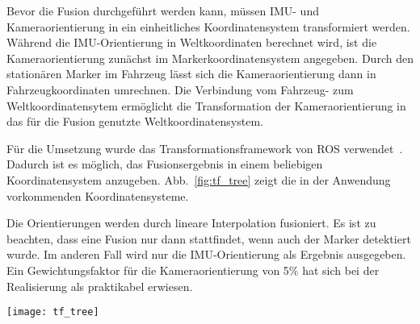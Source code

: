 Bevor die Fusion durchgeführt werden kann, müssen IMU- und Kameraorientierung in ein einheitliches Koordinatensystem transformiert werden.
Während die IMU-Orientierung in Weltkoordinaten berechnet wird, ist die Kameraorientierung zunächst im Markerkoordinatensystem angegeben.
Durch den stationären Marker im Fahrzeug lässt sich die Kameraorientierung dann in Fahrzeugkoordinaten umrechnen.
Die Verbindung vom Fahrzeug- zum Weltkoordinatensytem ermöglicht die Transformation der Kameraorientierung in das für die Fusion genutzte Weltkoordinatensystem.

Für die Umsetzung wurde das Transformationsframework von ROS verwendet~\cite{ros_tf}.
Dadurch ist es möglich, das Fusionsergebnis in einem beliebigen Koordinatensystem anzugeben. Abb.~\ref{fig:tf_tree} zeigt die in der Anwendung vorkommenden Koordinatensysteme.

Die Orientierungen werden durch lineare Interpolation fusioniert.
Es ist zu beachten, dass eine Fusion nur dann stattfindet, wenn auch der Marker detektiert wurde.
Im anderen Fall wird nur die IMU-Orientierung als Ergebnis ausgegeben.
Ein Gewichtungsfaktor für die Kameraorientierung von 5\% hat sich bei der Realisierung als praktikabel erwiesen.

\begin{figure*}[tb]
 \centering
 \texttt{[image: tf\_tree]}
  \caption{Koordinaten-Frames}
  \label{fig:tf_tree}
\end{figure*}

